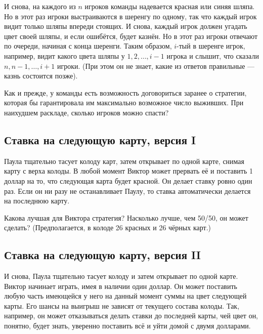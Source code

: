 И снова, на каждого из $n$ игроков команды надевается красная или синяя шляпа.
Но в этот раз игроки выстраиваются в шеренгу по одному, так что каждый игрок видит только шляпы впереди стоящих.
И снова, каждый игрок должен угадать цвет своей шляпы, и  если ошибётся, будет казнён.
Но в этот раз игроки отвечают по очереди, начиная с конца шеренги.
Таким образом, $i$-тый в шеренге игрок, например, видит какого цвета шляпы у $1, 2,\dots, i-1$ игрока и слышит, что сказали $n, n-1,\dots, i+1$ игроки.
(При этом он не знает, какие из ответов правильные --- казнь состоится позже).

\medskip

Как и прежде, у команды есть возможность договориться заранее о стратегии, которая бы гарантировала им максимально возможное число выживших.
При наихудшем раскладе, сколько игроков можно спасти?

\subsection*{Ставка на следующую карту, версия I} %

Паула тщательно тасует колоду карт, затем открывает по одной карте, снимая карту с верха колоды.
В любой момент Виктор может прервать её и поставить 1 доллар на то, что следующая карта будет красной.
Он делает ставку ровно один раз.
Если он ни разу не останавливает Паулу, то ставка автоматически делается на последнюю карту.

\medskip

Какова лучшая для Виктора стратегия?
Насколько лучше, чем 50/50, он может сделать? %
(Предполагается, в колоде 26 красных и 26 чёрных карт.)

\subsection*{Ставка на следующую карту, версия II} %

И снова, Паула тщательно тасует колоду и затем открывает по одной карте.
Виктор начинает играть, имея в наличии один доллар.
Он может поставить  любую часть имеющейся у него на данный момент суммы на цвет следующей карты.
Его шансы на выигрыш не зависят от текущего состава колоды.
Так, например, он может отказываться делать ставки до последней карты, чей цвет он, понятно, будет знать, уверенно поставить всё и уйти домой с двумя долларами.

